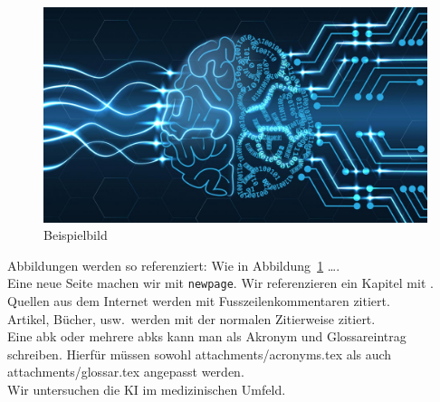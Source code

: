 \begin{figure}[h]
    \centering
    \includegraphics[width=1.0\textwidth]{images/bspbild.jpg}
    \caption{\label{fig:bsp}
        Beispielbild
        \protect{}
    }
\end{figure}

Abbildungen werden so referenziert: Wie in Abbildung~\ref{fig:bsp} \ldots.\\
Eine neue Seite machen wir mit \lstinline|newpage|. \newpage
Wir referenzieren ein Kapitel mit .\\
Quellen aus dem Internet werden mit Fusszeilenkommentaren zitiert.\\
Artikel, Bücher, usw.\ werden mit der normalen Zitierweise zitiert.\cite{usa_ai_approval}\\
Eine \gls{abk} oder mehrere \glspl{abk} kann man als Akronym und Glossareintrag schreiben.
Hierfür müssen sowohl attachments/acronyms.tex als 
auch attachments/glossar.tex angepasst werden.\\
Wir untersuchen die \gls{KI} im medizinischen Umfeld.
